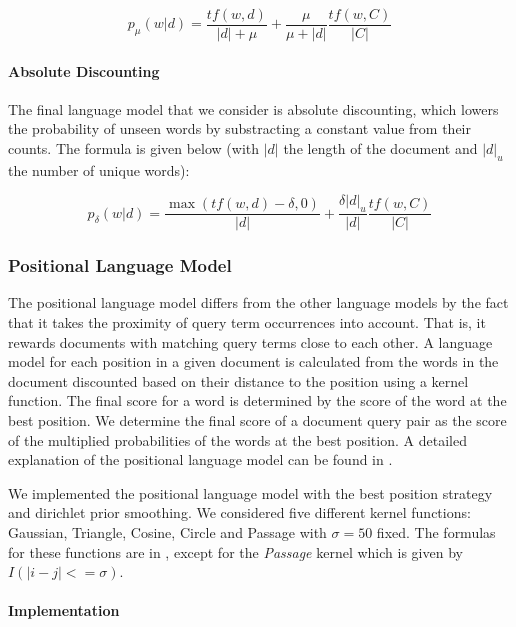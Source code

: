 \begin{equation*}
p_{\mu}(w | d) = \frac{tf(w,d)}{|d| + \mu}  + \frac{\mu}{\mu + |d|} \frac{tf(w,C)}{|C|}  
\end{equation*}


\paragraph{Absolute Discounting}

The final language model that we consider is absolute discounting,
which lowers the probability of unseen words by substracting a constant
value from their counts.
The formula is given below (with $|d|$ the length of the document and $|d|_u$ the number 
of unique words):

\begin{equation*}
p_{\delta}(w | d) = \frac{\max(tf(w,d) - \delta, 0)}{|d|} + \frac{\delta |d|_{u}}{|d|} \frac{tf(w,C)}{|C|}  
\end{equation*}


\subsubsection{Positional Language Model}

The positional language model differs from the other
language models by the fact that it takes the proximity
of query term occurrences into account. That is,
it rewards documents with matching query terms
close to each other.
A language model for each position in a given document 
is calculated from the words in the document discounted
based on their distance to the position using a kernel function.
The final score for a word is determined by the score 
of the word at the best position.
We determine the final score of a document query pair
as the score of the multiplied probabilities of the words 
at the best position. A detailed explanation
of the positional language model can be found in \cite{PLM}.

We implemented the positional language model
with the best position strategy and dirichlet prior smoothing.
We considered five different kernel functions:
Gaussian, Triangle, Cosine, Circle and Passage
with $\sigma = 50$ fixed.
The formulas for these functions are in \cite{PLM},
except for the \textit{Passage} kernel which
is given by $I(|i - j| <= \sigma)$.


\paragraph{Implementation}

